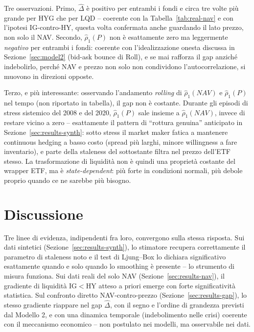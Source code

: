 \documentclass[11pt]{article}
\begin{document}
Tre osservazioni. Primo, $\widehat\Delta$ \`e positivo per entrambi i fondi e circa tre volte pi\`u grande per HYG che per LQD -- coerente con la Tabella~\ref{tab:real-nav} e con l'ipotesi IG-contro-HY, questa volta confermata anche guardando il lato prezzo, non solo il NAV. Secondo, $\hat\rho_1(P)$ non \`e esattamente zero ma leggermente \emph{negativo} per entrambi i fondi: coerente con l'idealizzazione onesta discussa in Sezione~\ref{sec:model2} (bid-ask bounce di Roll), e se mai rafforza il gap anzich\'e indebolirlo, perch\'e NAV e prezzo non solo non condividono l'autocorrelazione, si muovono in direzioni opposte.

Terzo, e pi\`u interessante: osservando l'andamento \emph{rolling} di $\hat\rho_1(NAV)$ e $\hat\rho_1(P)$ nel tempo (non riportato in tabella), il gap non \`e costante. Durante gli episodi di stress sistemico del 2008 e del 2020, $\hat\rho_1(P)$ sale insieme a $\hat\rho_1(NAV)$, invece di restare vicino a zero -- esattamente il pattern di ``rottura genuina'' anticipato in Sezione~\ref{sec:results-synth}: sotto stress il market maker fatica a mantenere continuous hedging a basso costo (spread pi\`u larghi, minore willingness a fare inventario), e parte della staleness del sottostante filtra nel prezzo dell'ETF stesso. La trasformazione di liquidit\`a non \`e quindi una propriet\`a costante del wrapper ETF, ma \`e \emph{state-dependent}: pi\`u forte in condizioni normali, pi\`u debole proprio quando ce ne sarebbe pi\`u bisogno.

\section{Discussione}
\label{sec:discussion}

Tre linee di evidenza, indipendenti fra loro, convergono sulla stessa risposta. Sui dati sintetici (Sezione~\ref{sec:results-synth}), lo stimatore recupera correttamente il parametro di staleness noto e il test di Ljung--Box lo dichiara significativo esattamente quando e solo quando lo smoothing \`e presente -- lo strumento di misura funziona. Sui dati reali del solo NAV (Sezione~\ref{sec:results-nav}), il gradiente di liquidit\`a IG$<$HY atteso a priori emerge con forte significativit\`a statistica. Sul confronto diretto NAV-contro-prezzo (Sezione~\ref{sec:results-gap}), lo stesso gradiente riappare nel gap $\widehat\Delta$, con il segno e l'ordine di grandezza previsti dal Modello 2, e con una dinamica temporale (indebolimento nelle crisi) coerente con il meccanismo economico -- non postulato nei modelli, ma osservabile nei dati.
\end{document}
